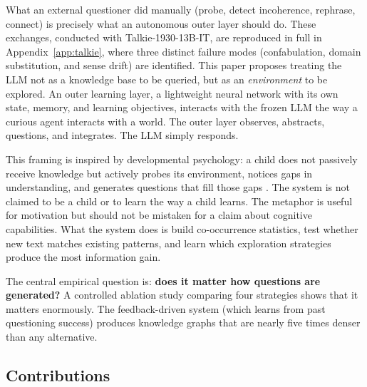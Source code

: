 \documentclass[conference]{IEEEtran}
\begin{document}
What an external questioner did manually (probe, detect incoherence, rephrase, connect) is precisely what an autonomous outer layer should do. These exchanges, conducted with Talkie-1930-13B-IT, are reproduced in full in Appendix~\ref{app:talkie}, where three distinct failure modes (confabulation, domain substitution, and sense drift) are identified. This paper proposes treating the LLM not as a knowledge base to be queried, but as an \emph{environment} to be explored. An outer learning layer, a lightweight neural network with its own state, memory, and learning objectives, interacts with the frozen LLM the way a curious agent interacts with a world. The outer layer observes, abstracts, questions, and integrates. The LLM simply responds.

This framing is inspired by developmental psychology: a child does not passively receive knowledge but actively probes its environment, notices gaps in understanding, and generates questions that fill those gaps \cite{gopnik1999,piaget1952}. The system is not claimed to be a child or to learn the way a child learns. The metaphor is useful for motivation but should not be mistaken for a claim about cognitive capabilities. What the system does is build co-occurrence statistics, test whether new text matches existing patterns, and learn which exploration strategies produce the most information gain.

The central empirical question is: \textbf{does it matter how questions are generated?} A controlled ablation study comparing four strategies shows that it matters enormously. The feedback-driven system (which learns from past questioning success) produces knowledge graphs that are nearly five times denser than any alternative.

\subsection{Contributions}
\end{document}
